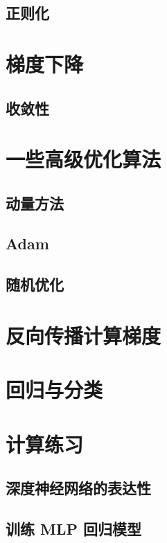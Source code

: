 \subsection{正则化}

\section{梯度下降}
\subsection{收敛性}

\section{一些高级优化算法}
\subsection{动量方法}
\subsection{Adam}
\subsection{随机优化}

\section{反向传播计算梯度}

\section{回归与分类}

\section{计算练习}
\subsection{深度神经网络的表达性}
\subsection{训练 MLP 回归模型}

\newpage
